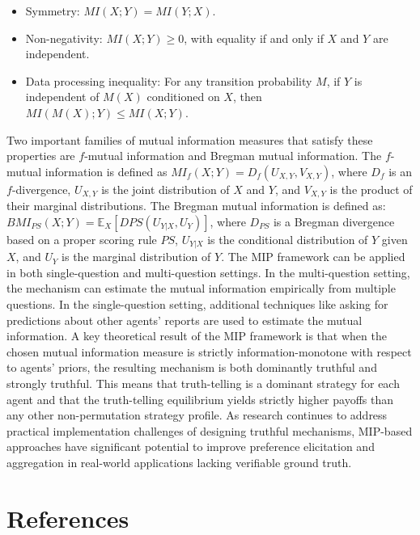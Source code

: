 \documentclass[
  letterpaper,
  numbers=noenddot,
  DIV=11]{scrreprt}
\theoremstyle{definition}
\theoremstyle{plain}
\theoremstyle{plain}
\theoremstyle{remark}
\begin{document}
\begin{itemize}
\item
  Symmetry: \(MI(X; Y) = MI(Y; X)\).
\item
  Non-negativity: \(MI(X; Y) \geq 0\), with equality if and only if
  \(X\) and \(Y\) are independent.
\item
  Data processing inequality: For any transition probability \(M\), if
  \(Y\) is independent of \(M(X)\) conditioned on \(X\), then
  \(MI(M(X); Y) \leq MI(X; Y)\).
\end{itemize}

Two important families of mutual information measures that satisfy these
properties are \(f\)-mutual information and Bregman mutual information.
The \(f\)-mutual information is defined as
\(MI_f(X; Y) = D_f(U_{X,Y}, V_{X,Y})\), where \(D_f\) is an
\(f\)-divergence, \(U_{X,Y}\) is the joint distribution of \(X\) and
\(Y\), and \(V_{X,Y}\) is the product of their marginal distributions.
The Bregman mutual information is defined as:
\(BMI_{PS}(X; Y) = \mathbb{E}_{X} [D{PS}(U_{Y|X}, U_Y)]\), where
\(D_{PS}\) is a Bregman divergence based on a proper scoring rule
\(PS\), \(U_{Y|X}\) is the conditional distribution of \(Y\) given
\(X\), and \(U_Y\) is the marginal distribution of \(Y\). The MIP
framework can be applied in both single-question and multi-question
settings. In the multi-question setting, the mechanism can estimate the
mutual information empirically from multiple questions. In the
single-question setting, additional techniques like asking for
predictions about other agents' reports are used to estimate the mutual
information. A key theoretical result of the MIP framework is that when
the chosen mutual information measure is strictly information-monotone
with respect to agents' priors, the resulting mechanism is both
dominantly truthful and strongly truthful. This means that truth-telling
is a dominant strategy for each agent and that the truth-telling
equilibrium yields strictly higher payoffs than any other
non-permutation strategy profile. As research continues to address
practical implementation challenges of designing truthful mechanisms,
MIP-based approaches have significant potential to improve preference
elicitation and aggregation in real-world applications lacking
verifiable ground truth.

\section*{References}\label{bibliography-5}
\end{document}
